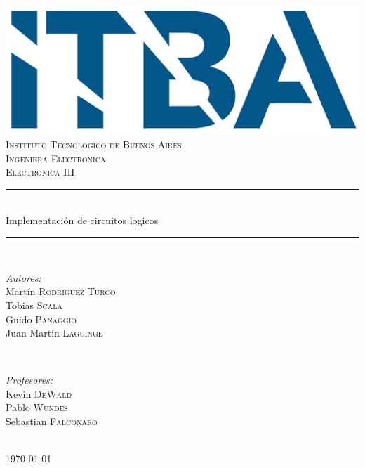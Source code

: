 \documentclass[11pt, spanish]{report}
\begin{document}
\begin{titlepage}

\newcommand{\HRule}{\rule{\linewidth}{0.5mm}}
\center 

\includegraphics[scale=0.25,bb=0 0 30 30]{logo.jpg}\\[0.5cm]

\textsc{\LARGE Instituto Tecnologico de Buenos Aires}\\[0.5cm] 
\textsc{\Large Ingeniera Electronica}\\[0.5cm] 
\textsc{\Large Electronica III}\\[0.5cm] 

\HRule \\[0.4cm]
{\LARGE  Implementación de circuitos logicos}\\[0.2cm] 
\HRule \\[0.4cm]

\begin{minipage}{0.4\textwidth}
\begin{flushleft} \large
\emph{Autores:}\\
Martín \textsc{Rodriguez Turco}
\\
Tobias \textsc{Scala}
\\
Guido \textsc{Panaggio}
\\
Juan Martin \textsc{Laguinge} 
\end{flushleft}
\end{minipage}
~
\begin{minipage}{0.4\textwidth}
\begin{flushright} \large
\emph{Profesores:} \\
Kevin \textsc{DeWald} %
\\
Pablo \textsc{Wundes} %
\\
Sebastian \textsc{Falconaro} %
\end{flushright}
\end{minipage}\\[6cm]

{\large \today}\\[3cm]
\vfill 

\end{titlepage}
\end{document}
